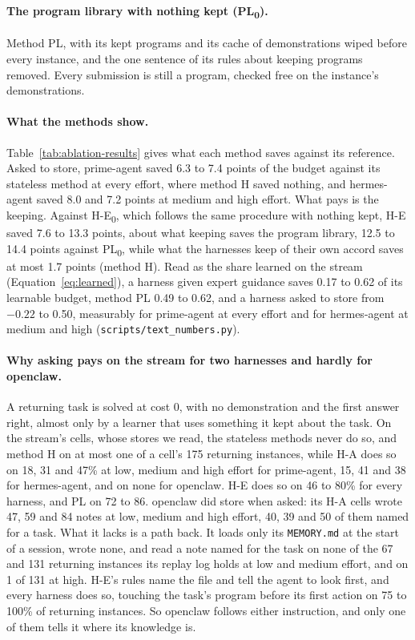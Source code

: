 \paragraph{The program library with nothing kept (PL\textsubscript{0}).}
Method PL, with its kept programs and its cache of demonstrations wiped before every instance, and the one sentence of its rules about keeping programs removed. Every submission is still a program, checked free on the instance's demonstrations.

\paragraph{What the methods show.}
Table~\ref{tab:ablation-results} gives what each method saves against its reference. Asked to store, prime-agent saved 6.3 to 7.4 points of the budget against its stateless method at every effort, where method H saved nothing, and hermes-agent saved 8.0 and 7.2 points at medium and high effort. What pays is the keeping. Against \mbox{H-E\textsubscript{0}}, which follows the same procedure with nothing kept, \mbox{H-E} saved 7.6 to 13.3 points, about what keeping saves the program library, 12.5 to 14.4 points against PL\textsubscript{0}, while what the harnesses keep of their own accord saves at most 1.7 points (method H). Read as the share learned on the stream (Equation~\ref{eq:learned}), a harness given expert guidance saves 0.17 to 0.62 of its learnable budget, method PL 0.49 to 0.62, and a harness asked to store from $-0.22$ to 0.50, measurably for prime-agent at every effort and for hermes-agent at medium and high (\texttt{scripts/text\_numbers.py}).

\paragraph{Why asking pays on the stream for two harnesses and hardly for openclaw.}
A returning task is solved at cost 0, with no demonstration and the first answer right, almost only by a learner that uses something it kept about the task. On the stream's cells, whose stores we read, the stateless methods never do so, and method H on at most one of a cell's 175 returning instances, while \mbox{H-A} does so on 18, 31 and 47\% at low, medium and high effort for prime-agent, 15, 41 and 38 for hermes-agent, and on none for openclaw. \mbox{H-E} does so on 46 to 80\% for every harness, and PL on 72 to 86. openclaw did store when asked: its \mbox{H-A} cells wrote 47, 59 and 84 notes at low, medium and high effort, 40, 39 and 50 of them named for a task. What it lacks is a path back. It loads only its \texttt{MEMORY.md} at the start of a session, wrote none, and read a note named for the task on none of the 67 and 131 returning instances its replay log holds at low and medium effort, and on 1 of 131 at high. \mbox{H-E}'s rules name the file and tell the agent to look first, and every harness does so, touching the task's program before its first action on 75 to 100\% of returning instances. So openclaw follows either instruction, and only one of them tells it where its knowledge is.

